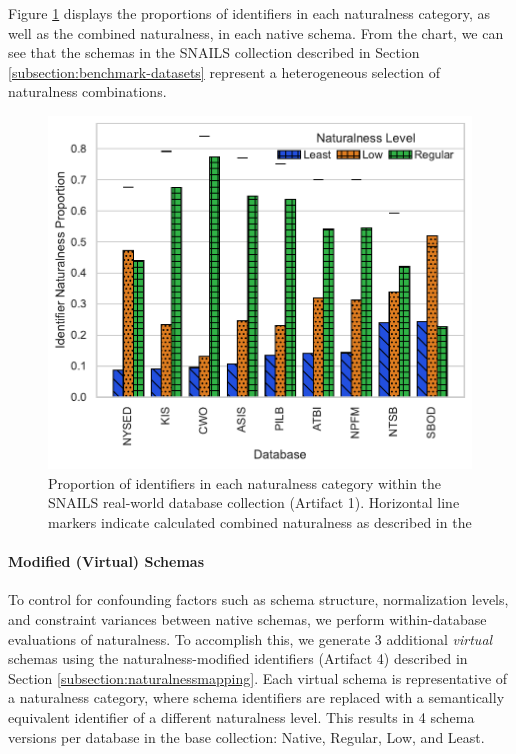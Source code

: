 Figure \ref{fig:databasenaturalness} displays the proportions of identifiers in each naturalness category, as well as the combined naturalness, in each native schema.
From the chart, we can see that the schemas in the SNAILS collection described in Section \ref{subsection:benchmark-datasets} represent a heterogeneous selection of naturalness combinations.

\begin{figure}
  \centering
  \includegraphics[width=\figwidthmod\linewidth]{figures/naturalness_by_db.pdf}
  \caption{Proportion of identifiers in each naturalness category within the SNAILS real-world database collection (Artifact 1). Horizontal line markers indicate calculated combined naturalness as described in the \fi}
  \label{fig:databasenaturalness}
\end{figure}

\paragraph{\textbf{Modified (Virtual) Schemas}}
To control for confounding factors such as schema structure, normalization levels, and constraint variances between native schemas, we perform within-database evaluations of naturalness.
To accomplish this, we generate 3 additional \emph{virtual} schemas using the naturalness-modified identifiers (Artifact 4) described in Section \ref{subsection:naturalnessmapping}.
Each virtual schema is representative of a naturalness category, where schema identifiers are replaced with a semantically equivalent identifier of a different naturalness level.
This results in 4 schema versions per database in the base collection: Native, Regular, Low, and Least.


